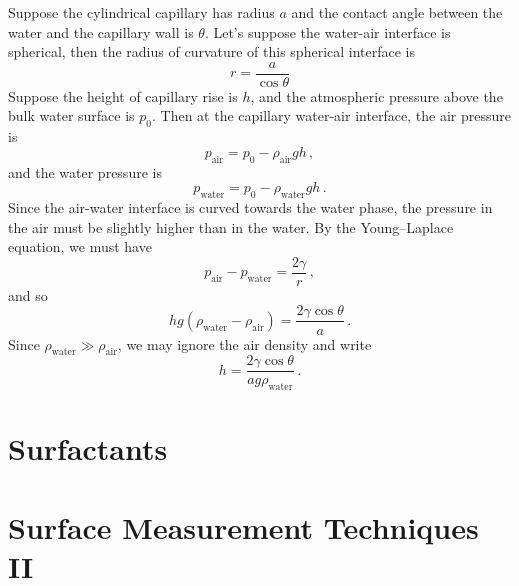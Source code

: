 \documentclass{article}
\theoremstyle{plain}\theoremheaderfont{\normalfont\itshape}\theorembodyfont{\rmfamily}\theoremseparator{.}\newtheorem*{rem}{Remark}\newtheorem*{ex}{Example}\newtheorem*{proof}{Proof}\newtheorem*{altp}{Alternative proof}
\theoremstyle{plain}\theoremheaderfont{\normalfont\bfseries}\theorembodyfont{\rmfamily}\theoremseparator{.}\newtheorem{thm}{Theorem}[section]\newtheorem{lem}[thm]{Lemma}\newtheorem{prop}[thm]{Proposition}\newtheorem*{cor}{Corollary}\newtheorem{defn}[thm]{Definition}\newtheorem{clm}[thm]{Claim}\newtheorem{clminproof}{Claim}\newtheorem*{law}{Law}\newtheorem{pos}[thm]{Postulate}
\theoremstyle{break}\theoremheaderfont{\normalfont\itshape}\theorembodyfont{\rmfamily}\theoremseparator{.\medskip}\newtheorem*{proofskip}{Proof}\newtheorem*{exs}{Examples}\newtheorem*{rems}{Remarks}
\theoremstyle{break}\theoremheaderfont{\normalfont\bfseries}\theorembodyfont{\rmfamily}\theoremseparator{.\medskip}\newtheorem{lemskip}[thm]{Lemma}\newtheorem{defnskip}[thm]{Definition}\newtheorem{propskip}[thm]{Proposition}\newtheorem{thmskip}[thm]{Theorem}
\numberwithin{equation}{section}
\begin{document}
	Suppose the cylindrical capillary has radius \(a\) and the contact angle between the water and the capillary wall is \(\theta\). Let's suppose the water-air interface is spherical, then the radius of curvature of this spherical interface is
	\begin{equation}
		r=\frac{a}{\cos\theta}
	\end{equation}
	Suppose the height of capillary rise is \(h\), and the atmospheric pressure above the bulk water surface is \(p_0\). Then at the capillary water-air interface, the air pressure is
	\begin{equation}
		p_{\text{air}} = p_0 - \rho_{\text{air}}gh\,,
	\end{equation}
	and the water pressure is
	\begin{equation}
		p_{\text{water}} = p_0 - \rho_{\text{water}}gh\,.
	\end{equation}
	Since the air-water interface is curved towards the water phase, the pressure in the air must be slightly higher than in the water. By the Young--Laplace equation, we must have
	\begin{equation}
		p_{\text{air}}-p_{\text{water}}=\frac{2\gamma}{r}\,,
	\end{equation}
	and so
	\begin{equation}
		hg(\rho_{\text{water}}-\rho_{\text{air}})=\frac{2\gamma\cos\theta}{a}\,.
	\end{equation}
	Since \(\rho_{\text{water}}\gg \rho_{\text{air}}\), we may ignore the air density and write
	\begin{equation}
		h=\frac{2\gamma\cos\theta}{ag\rho_{\text{water}}}\,.
	\end{equation}

	\section{Surfactants}

	\section{Surface Measurement Techniques II}



	

	

	
\end{document}
